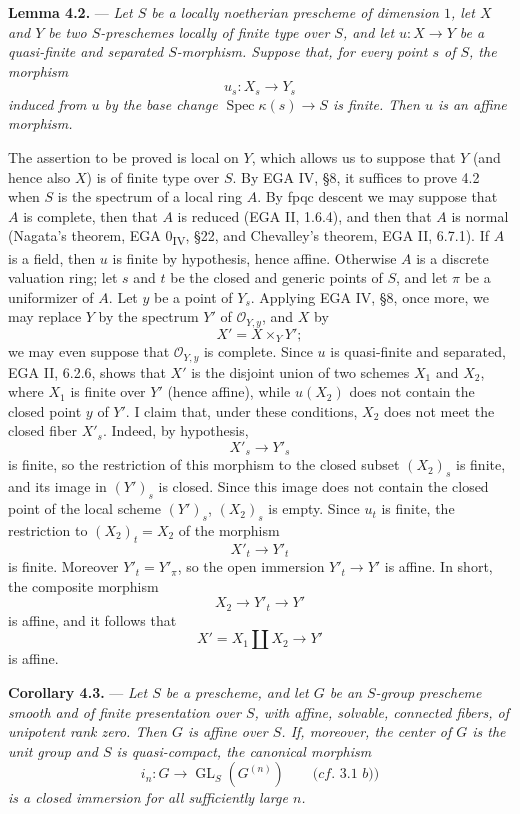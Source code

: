 \medskip
\noindent{}%
\textbf{Lemma 4.2.} --- \textit{Let \(S\) be a locally noetherian
prescheme of dimension \(1\), let \(X\) and \(Y\) be two
\(S\)-preschemes locally of finite type over \(S\), and let
\(u:X\to Y\) be a quasi-finite and separated \(S\)-morphism.
Suppose that, for every point \(s\) of \(S\), the morphism}
\[
  u_s:X_s\longrightarrow Y_s
\]
\textit{induced from \(u\) by the base change
\(\operatorname{Spec}\kappa(s)\to S\) is finite. Then \(u\) is an
affine morphism.}

\medskip
The assertion to be proved is local on \(Y\), which allows us to
suppose that \(Y\) (and hence also \(X\)) is of finite type over
\(S\). By EGA IV, \S8, it suffices to prove 4.2 when \(S\) is the
spectrum of a local ring \(A\). By fpqc descent we may suppose
that \(A\) is complete, then that \(A\) is reduced (EGA II,
1.6.4), and then that \(A\) is normal (Nagata's theorem, EGA
0\textsubscript{IV}, \S22, and Chevalley's theorem, EGA II,
6.7.1). If \(A\) is a field, then \(u\) is finite by hypothesis,
hence affine. Otherwise \(A\) is a discrete valuation ring; let
\(s\) and \(t\) be the closed and generic points of \(S\), and let
\(\pi\) be a uniformizer of \(A\). Let \(y\) be a point of \(Y_s\).
Applying EGA IV, \S8, once more, we may replace \(Y\) by the
spectrum \(Y'\) of \(\mathcal O_{Y,y}\), and \(X\) by
\[
  X'=X\times_Y Y';
\]
we may even suppose that \(\mathcal O_{Y,y}\) is complete. Since
\(u\) is quasi-finite and separated, EGA II, 6.2.6, shows that
\(X'\) is the disjoint union of two schemes \(X_1\) and \(X_2\),
where \(X_1\) is finite over \(Y'\) (hence affine), while
\(u(X_2)\) does not contain the closed point \(y\) of \(Y'\). I
claim that, under these conditions, \(X_2\) does not meet the
closed fiber \(X'_s\). Indeed, by hypothesis,
\[
  X'_s\longrightarrow Y'_s
\]
is finite, so the restriction of this morphism to the closed
subset \((X_2)_s\) is finite, and its image in \((Y')_s\) is
closed. Since this image does not contain the closed point of the
local scheme \((Y')_s\), \((X_2)_s\) is empty. Since \(u_t\) is
finite, the restriction to \((X_2)_t=X_2\) of the morphism
\[
  X'_t\longrightarrow Y'_t
\]
is finite. Moreover \(Y'_t=Y'_\pi\), so the open immersion
\(Y'_t\to Y'\) is affine. In short, the composite morphism
\[
  X_2\longrightarrow Y'_t\longrightarrow Y'
\]
is affine, and it follows that
\[
  X'=X_1\amalg X_2\longrightarrow Y'
\]
is affine.

\medskip
\noindent{}%
\textbf{Corollary 4.3.} --- \textit{Let \(S\) be a prescheme, and
let \(G\) be an \(S\)-group prescheme smooth and of finite
presentation over \(S\), with affine, solvable, connected fibers,
of unipotent rank zero. Then \(G\) is affine over \(S\). If,
moreover, the center of \(G\) is the unit group and \(S\) is
quasi-compact, the canonical morphism}
\[
  i_n:G\longrightarrow\operatorname{GL}_S(G^{(n)})
  \qquad\textit{(cf.\ 3.1 b))}
\]
\textit{is a closed immersion for all sufficiently large \(n\).}

